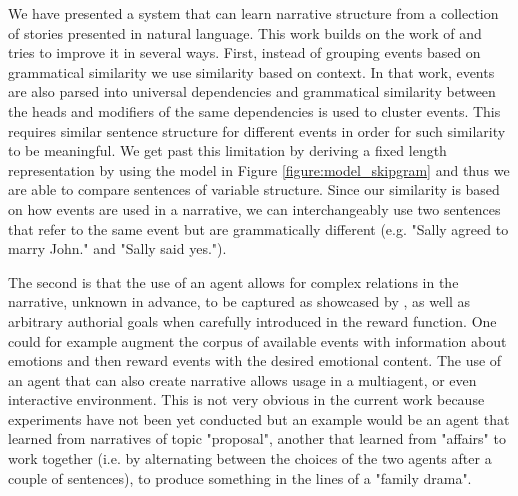 \documentclass[11pt,letterpaper]{article}
\begin{document}
We have presented a system that can learn narrative structure from a collection of stories presented in natural language. This work builds on the work of \cite{li2013story} and tries to improve it in several ways. First, instead of grouping events based on grammatical similarity we use similarity based on context. In that work, events are also parsed into  universal dependencies and grammatical similarity between the heads and modifiers of the same dependencies is used to cluster events. This requires similar sentence structure for different events in order for such similarity to be meaningful. We get past this limitation by deriving a fixed length representation by using the model in Figure \ref{figure:model_skipgram} and thus we are able to compare sentences of variable structure. Since our similarity is based on how events are used in a narrative, we can interchangeably use two sentences that refer to the same event but are grammatically different (e.g. "Sally agreed to marry John." and "Sally said yes.").

The second is that the use of an agent allows for complex relations in the narrative, unknown in advance, to be captured as showcased by \cite{narasimhan2015language,he2015deep}, as well as arbitrary authorial goals when carefully introduced in the reward function. One could for example augment the corpus of available events with information about emotions \cite{francisco2007emotag} and then reward events with the desired emotional content. The use of an agent that can also create narrative allows usage in a multiagent, or even interactive environment. This is not very obvious in the current work because experiments have not been yet conducted but an example would be an agent that learned from narratives of topic "proposal", another that learned from "affairs" to work together (i.e. by alternating between the choices of the two agents after a couple of sentences), to produce something in the lines of a "family drama".  
\end{document}
